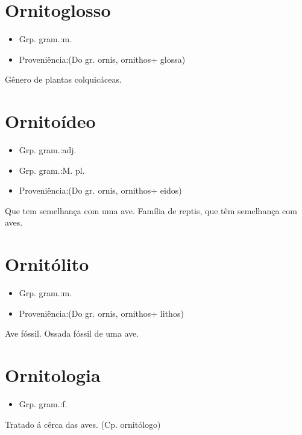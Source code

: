 \section{Ornitoglosso}
\begin{itemize}
\item {Grp. gram.:m.}
\end{itemize}
\begin{itemize}
\item {Proveniência:(Do gr. \textunderscore ornis\textunderscore , \textunderscore ornithos\textunderscore  + \textunderscore glossa\textunderscore )}
\end{itemize}
Gênero de plantas colquicáceas.
\section{Ornitoídeo}
\begin{itemize}
\item {Grp. gram.:adj.}
\end{itemize}
\begin{itemize}
\item {Grp. gram.:M. pl.}
\end{itemize}
\begin{itemize}
\item {Proveniência:(Do gr. \textunderscore ornis\textunderscore , \textunderscore ornithos\textunderscore  + \textunderscore eidos\textunderscore )}
\end{itemize}
Que tem semelhança com uma ave.
Família de reptis, que têm semelhança com aves.
\section{Ornitólito}
\begin{itemize}
\item {Grp. gram.:m.}
\end{itemize}
\begin{itemize}
\item {Proveniência:(Do gr. \textunderscore ornis\textunderscore , \textunderscore ornithos\textunderscore  + \textunderscore lithos\textunderscore )}
\end{itemize}
Ave fóssil.
Ossada fóssil de uma ave.
\section{Ornitologia}
\begin{itemize}
\item {Grp. gram.:f.}
\end{itemize}
Tratado á cêrca das aves.
(Cp. \textunderscore ornitólogo\textunderscore )

